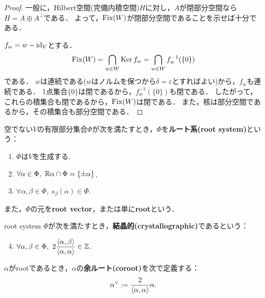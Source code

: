 \begin{proof}
  一般に，Hilbert空間(完備内積空間)$H$に対し，$A$が閉部分空間なら$H = A \oplus A^\perp$である．
  よって，$\operatorname{Fix}(W)$が閉部分空間であることを示せば十分である．

  $f_w = w - \operatorname{id}_V$とする．
  \begin{equation}
    \operatorname{Fix}(W) = \bigcap_{w \in W} \operatorname{Ker} f_w = \bigcap_{w \in W} f_w^{-1}(\{0\})
  \end{equation}
  である．
  $w$は連続である($w$はノルムを保つから$\delta = \varepsilon$とすればよい)から，$f_w$も連続である．
  1点集合$\{0\}$は閉であるから，$f_w^{-1}(\{0\})$も閉である．
  したがって，これらの積集合も閉であるから，$\operatorname{Fix}(W)$は閉である．
  また，核は部分空間であるから，その積集合も部分空間である．
\end{proof}

\begin{definition}
  空でない$V$の有限部分集合$\Phi$が次を満たすとき，$\Phi$を\textbf{ルート系(root system)}という：
  \begin{enumerate}[label=(\roman*)]
    \item $\Phi$は$V$を生成する, \label{defi:root_gen}
    \item $\forall \alpha \in \Phi,\ \mathbb{R} \alpha \cap \Phi = \{\pm \alpha\}$, \label{defi:root_self}
    \item $\forall \alpha, \beta \in \Phi,\ s_\beta(\alpha) \in \Phi$. \label{defi:root_ref_closed}
  \end{enumerate}
  また，$\Phi$の元を\textbf{root vector}，または単に\textbf{root}という．
\end{definition}

\begin{definition}
  root system $\Phi$が次を満たすとき，\textbf{結晶的(crystallographic)}であるという：
  \begin{enumerate}[label=(\roman*)]
    \setcounter{enumi}{3}
    \item $\forall \alpha, \beta \in \Phi,\ 2 \dfrac{\left\langle \alpha, \beta \right\rangle}{\left\langle \alpha, \alpha \right\rangle} \in \mathbb{Z}$.
  \end{enumerate}
\end{definition}

\begin{definition}
  $\alpha$がrootであるとき，$\alpha$の\textbf{余ルート(coroot)}を次で定義する：
  \begin{equation}
    \alpha^\vee := \frac{2}{\left\langle \alpha, \alpha \right\rangle} \alpha.
  \end{equation}
\end{definition}

